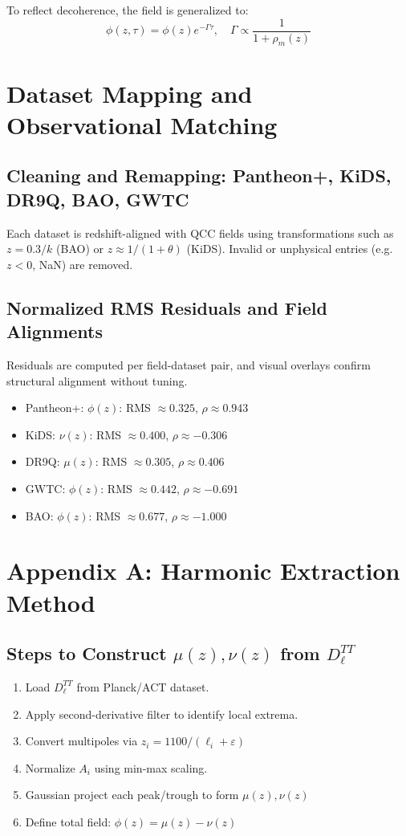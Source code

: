 \documentclass[12pt]{article}
\begin{document}
To reflect decoherence, the field is generalized to:
\[
\phi(z, \tau) = \phi(z) e^{-\Gamma \tau}, \quad \Gamma \propto \frac{1}{1 + \rho_m(z)}
\]

\section{Dataset Mapping and Observational Matching}
\subsection{Cleaning and Remapping: Pantheon+, KiDS, DR9Q, BAO, GWTC}
Each dataset is redshift-aligned with QCC fields using transformations such as \( z = 0.3/k \) (BAO) or \( z \approx 1/(1+\theta) \) (KiDS). Invalid or unphysical entries (e.g. \( z < 0 \), NaN) are removed.

\subsection{Normalized RMS Residuals and Field Alignments}
Residuals are computed per field-dataset pair, and visual overlays confirm structural alignment without tuning.
\begin{itemize}
  \item Pantheon+: \( \phi(z) \): RMS \( \approx 0.325 \), \( \rho \approx 0.943 \)
  \item KiDS: \( \nu(z) \): RMS \( \approx 0.400 \), \( \rho \approx -0.306 \)
  \item DR9Q: \( \mu(z) \): RMS \( \approx 0.305 \), \( \rho \approx 0.406 \)
  \item GWTC: \( \phi(z) \): RMS \( \approx 0.442 \), \( \rho \approx -0.691 \)
  \item BAO: \( \phi(z) \): RMS \( \approx 0.677 \), \( \rho \approx -1.000 \)
\end{itemize}

\appendix
\section*{Appendix A: Harmonic Extraction Method}
\subsection*{Steps to Construct \( \mu(z), \nu(z) \) from \( D^{TT}_\ell \)}
\begin{enumerate}
  \item Load \( D^{TT}_\ell \) from Planck/ACT dataset.
  \item Apply second-derivative filter to identify local extrema.
  \item Convert multipoles via \( z_i = 1100 / (\ell_i + \varepsilon) \)
  \item Normalize \( A_i \) using min-max scaling.
  \item Gaussian project each peak/trough to form \( \mu(z), \nu(z) \)
  \item Define total field: \( \phi(z) = \mu(z) - \nu(z) \)
\end{enumerate}
\end{document}
